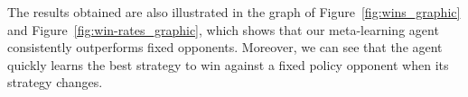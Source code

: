 The results obtained are also illustrated in the graph of Figure~\ref{fig:wins_graphic} and Figure~\ref{fig:win-rates_graphic}, which shows that our meta-learning agent consistently outperforms fixed opponents. 
Moreover, we can see that the agent quickly learns the best strategy to win against a fixed policy opponent when its strategy changes. 